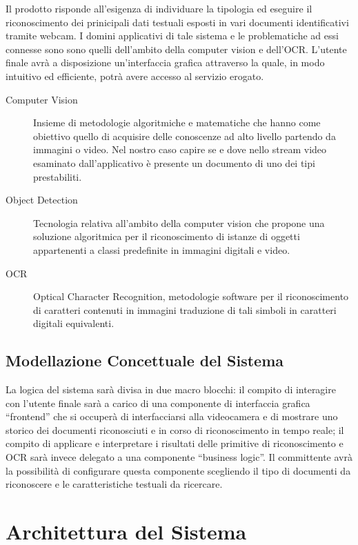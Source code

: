 \documentclass[12pt,a4paper]{article}
\begin{document}
Il prodotto risponde all'esigenza di individuare la tipologia ed
eseguire il riconoscimento dei prinicipali dati testuali esposti in vari
documenti identificativi tramite webcam. I domini applicativi di tale
sistema e le problematiche ad essi connesse sono sono quelli dell'ambito
della computer vision e dell'OCR. L'utente finale avrà a disposizione
un'interfaccia grafica attraverso la quale, in modo intuitivo ed
efficiente, potrà avere accesso al servizio erogato.

\begin{description}
    \item[Computer Vision] Insieme di metodologie algoritmiche e
        matematiche che hanno come obiettivo quello di acquisire delle
        conoscenze ad alto livello partendo da immagini o video. Nel
        nostro caso capire se e dove nello stream video esaminato
        dall'applicativo è presente un documento di uno dei tipi
        prestabiliti.
    \item[Object Detection] Tecnologia relativa all'ambito della
        computer vision che propone una soluzione algoritmica per il
        riconoscimento di istanze di oggetti appartenenti a classi
        predefinite in immagini digitali e video.
    \item[OCR] Optical Character Recognition, metodologie software per
        il riconoscimento di caratteri contenuti in immagini traduzione
        di tali simboli in caratteri digitali equivalenti.
\end{description}

\subsection{Modellazione Concettuale del Sistema}

La logica del sistema sarà divisa in due macro blocchi: il compito di
interagire con l'utente finale sarà a carico di una componente di
interfaccia grafica ``frontend'' che si occuperà di interfacciarsi alla
videocamera e di mostrare uno storico dei documenti riconosciuti e in
corso di riconoscimento in tempo reale; il compito di applicare e
interpretare i risultati delle primitive di riconoscimento e OCR sarà
invece delegato a una componente ``business logic''. Il committente
avrà la possibilità di configurare questa componente scegliendo il tipo
di documenti da riconoscere e le caratteristiche testuali da ricercare.

\section{Architettura del Sistema}
\end{document}
